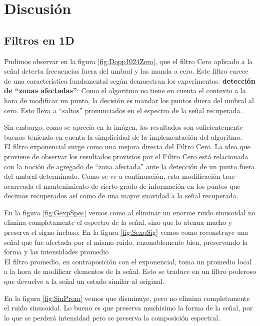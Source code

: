 \section{Discusi\'on}

\subsection{Filtros en 1D}

Pudimos observar en la figura \ref{fig:Dopp1024Zero}, que el filtro Cero
aplicado a la se\~nal detecta frecuencias fuera del umbral y
las manda a cero. Este filtro carece de una caracter\'istica fundamental
seg\'un demuestran los experimentos:
{\bf detecci\'on de ``zonas afectadas''}: Como el algoritmo no tiene en
cuenta el contexto a la hora de modificar un punto, la decisi\'on es mandar los
puntos duera del umbral al cero. Esto lleva a ``saltos'' pronunciados en
el espectro de la se\~nal recuperada.

Sin embargo, como se aprecia en la im\'agen, los resultados son suficientemente
buenos teniendo en cuenta la simplicidad de la implementaci\'on del algoritmo.\\

El filtro exponencial surge como una mejora directa del Filtro Cero.
La idea que proviene de
observar los resultados provistos por el Filtro Cero est\'a relacionada con la
noci\'on de agregado de ``zona afectada'' ante la detecci\'on de un punto fuera
del umbral determinado. Como se ve a continuaci\'on, esta modificaci\'on trae
acarreada el mantenimiento de cierto grado de informaci\'on en los puntos que
decimos recuperados as\'i como de una mayor suavidad a la se\~nal recuperada.

En la figura \ref{fig:GexpSpec} vemos como al eliminar un enorme ruido
sinusoidal no elimina completamente el espectro de la se\~nal, sino que
lo atenua mucho y preserva el signo incluso. En la figura \ref{fig:SexpSig} vemos
como reconstruye una se\~nal que fue afectada por el mismo ruido, razonablemente
bien, preservando la forma y las intensidades promedio\\


El filtro promedio, en contraposici\'on con el exponencial, toma un promedio
local a la hora de modificar elementos de la se\~nal. Esto se traduce en un
filtro poderoso que devuelve a la se\~nal un estado similar al original.

En la figura \ref{fig:SinProm} vemos que disminuye, pero no elimina completamente
el ruido sinusoidal. Lo bueno es que preserva muchisimo la forma de la
se\~nal, por lo que se perder\'a intensidad pero se preserva la composici\'on
espectral.\\


